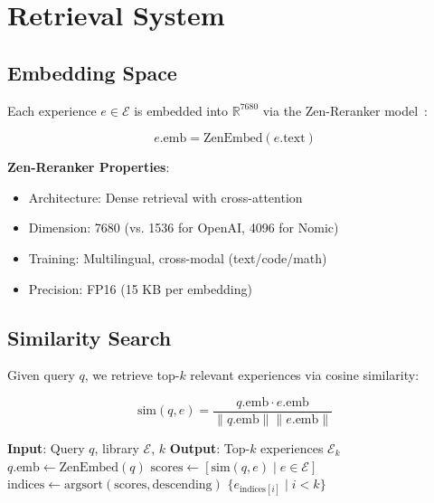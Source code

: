 \section{Retrieval System}

\label{sec:retrieval}

\subsection{Embedding Space}

Each experience $e \in \mathcal{E}$ is embedded into $\mathbb{R}^{7680}$ via the Zen-Reranker model~\cite{zoo2025zen}:

\begin{equation}
e.\text{emb} = \text{ZenEmbed}(e.\text{text})
\end{equation}

\textbf{Zen-Reranker Properties}:
\begin{itemize}
    \item Architecture: Dense retrieval with cross-attention
    \item Dimension: 7680 (vs. 1536 for OpenAI, 4096 for Nomic)
    \item Training: Multilingual, cross-modal (text/code/math)
    \item Precision: FP16 (15 KB per embedding)
\end{itemize}

\subsection{Similarity Search}

Given query $q$, we retrieve top-$k$ relevant experiences via cosine similarity:

\begin{equation}
\text{sim}(q, e) = \frac{q.\text{emb} \cdot e.\text{emb}}{\|q.\text{emb}\| \|e.\text{emb}\|}
\end{equation}

\begin{algorithm}[t]
\caption{Top-k Experience Retrieval}
\label{alg:retrieval}
\begin{algorithmic}[1]
\STATE \textbf{Input}: Query $q$, library $\mathcal{E}$, $k$
\STATE \textbf{Output}: Top-$k$ experiences $\mathcal{E}_k$
\STATE $q.\text{emb} \leftarrow \text{ZenEmbed}(q)$
\STATE $\text{scores} \leftarrow [\text{sim}(q, e) \mid e \in \mathcal{E}]$
\STATE $\text{indices} \leftarrow \text{argsort}(\text{scores}, \text{descending})$
\RETURN $\{e_{\text{indices}[i]} \mid i < k\}$
\end{algorithmic}
\end{algorithm}

